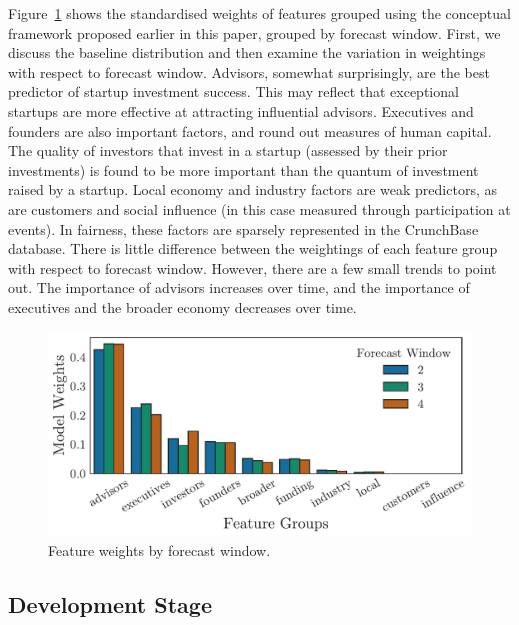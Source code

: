 ﻿\documentclass[../thesis/thesis.tex]{subfiles}
\begin{document}
Figure~\ref{fig:evaluation:features_window} shows the standardised weights of features grouped using the conceptual framework proposed earlier in this paper, grouped by forecast window. First, we discuss the baseline distribution and then examine the variation in weightings with respect to forecast window. Advisors, somewhat surprisingly, are the best predictor of startup investment success. This may reflect that exceptional startups are more effective at attracting influential advisors. Executives and founders are also important factors, and round out measures of human capital. The quality of investors that invest in a startup (assessed by their prior investments) is found to be more important than the quantum of investment raised by a startup. Local economy and industry factors are weak predictors, as are customers and social influence (in this case measured through participation at events). In fairness, these factors are sparsely represented in the CrunchBase database. There is little difference between the weightings of each feature group with respect to forecast window. However, there are a few small trends to point out. The importance of advisors increases over time, and the importance of executives and the broader economy decreases over time.

\begin{figure}[!htb]
    \centering
    \includegraphics[width=\textwidth]{../figures/evaluation/features_window}
    \caption[Feature weights by forecast window]{Feature weights by forecast window.}
    \label{fig:evaluation:features_window}
\end{figure}

\subsection{Development Stage}

\end{document}
